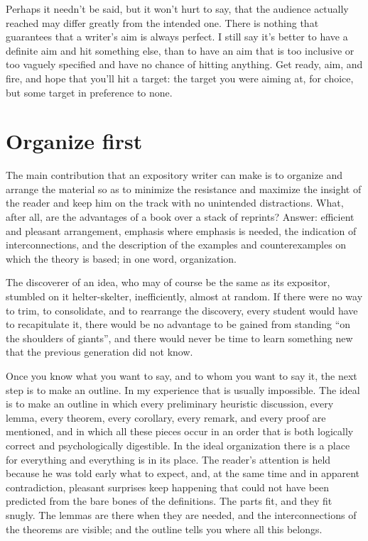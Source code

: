 \documentclass[12pt]{article}
\begin{document}
Perhaps it needn't be said, but it won't hurt to say, that the audience actually reached may differ greatly from the intended one. There is nothing that guarantees that a writer's aim is always perfect. I still say it's better to have a definite aim and hit something else, than to have an aim that is too inclusive or too vaguely specified and have no chance of hitting anything. Get ready, aim, and fire, and hope that you'll hit a target: the target you were aiming at, for choice, but some target in preference to none.

\section{Organize first}

The main contribution that an expository writer can make is to organize and arrange the material so as to minimize the resistance and maximize the insight of the reader and keep him on the track with no unintended distractions. What, after all, are the advantages of a book over a stack of reprints? Answer: efficient and pleasant arrangement, emphasis where emphasis is needed, the indication of interconnections, and the description of the examples and counterexamples on which the theory is based; in one word, organization.

The discoverer of an idea, who may of course be the same as its expositor, stumbled on it helter-skelter, inefficiently, almost at random. If there were no way to trim, to consolidate, and to rearrange the discovery, every student would have to recapitulate it, there would be no advantage to be gained from standing ``on the shoulders of giants'', and there would never be time to learn something new that the previous generation did not know. 

Once you know what you want to say, and to whom you want to say it, the next step is to make an outline. In my experience that is usually impossible. The ideal is to make an outline in which every preliminary heuristic discussion, every lemma, every theorem, every corollary, every remark, and every proof are mentioned, and in which all these pieces occur in an order that is both logically correct and psychologically digestible. In the ideal organization there is a place for everything and everything is in its place. The reader's attention is held because he was told early what to expect, and, at the same time and in apparent contradiction, pleasant surprises keep happening that could not have been predicted from the bare bones of the definitions. The parts fit, and they fit snugly. The lemmas are there when they are needed, and the interconnections of the theorems are visible; and the outline tells you where all this belongs.
\end{document}

